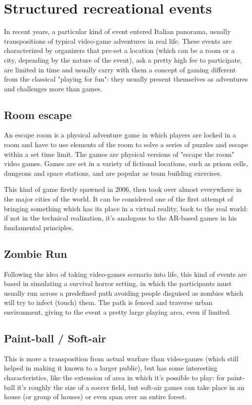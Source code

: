 	\section{Structured recreational events}
	
		In recent years, a particular kind of event entered Italian panorama, usually transpositions of typical video-game adventures in real life.
		These events are characterized by organizers that pre-set a location (which can be a room or a city, depending by the nature of the event), ask a pretty high fee to participate, are limited in time and usually carry with them a concept of gaming different from the classical "playing for fun": they usually present themselves as adventures and challenges more than games.
		
		\subsection{Room escape}
		
			\begin{quoting}
				An escape room is a physical adventure game in which players are locked in a room and have to use elements of the room to solve a series of puzzles and escape within a set time limit. The games are physical versions of "escape the room" video games. Games are set in a variety of fictional locations, such as prison cells, dungeons and space stations, and are popular as team building exercises.~\cite{wiki:escape}
			\end{quoting}
		
			This kind of game firstly spawned in 2006, then took over almost everywhere in the major cities of the world.
			It can be considered one of the first attempt of bringing something which has its place in a virtual reality, back to the real world: if not in the technical realization, it's analogous to the AR-based games in his fundamental principles.
		
		\subsection{Zombie Run}
		
			Following the idea of taking video-games scenario into life, this kind of events are based in simulating a survival horror setting, in which the participants must usually run across a predefined path avoiding people disguised as zombies which will try to infect (touch) them. The path is fenced and traverse urban environment, giving to the event a pretty large playing area, even if limited.
		
		\subsection{Paint-ball / Soft-air}
			
			This is more a transposition from actual warfare than video-games (which still helped in making it known to a larger public), but has some interesting characteristics, like the extension of area in which it's possible to play: for paint-ball it's roughly the size of a soccer field, but soft-air games can take place in an house (or group of houses) or even span over an entire forest.
